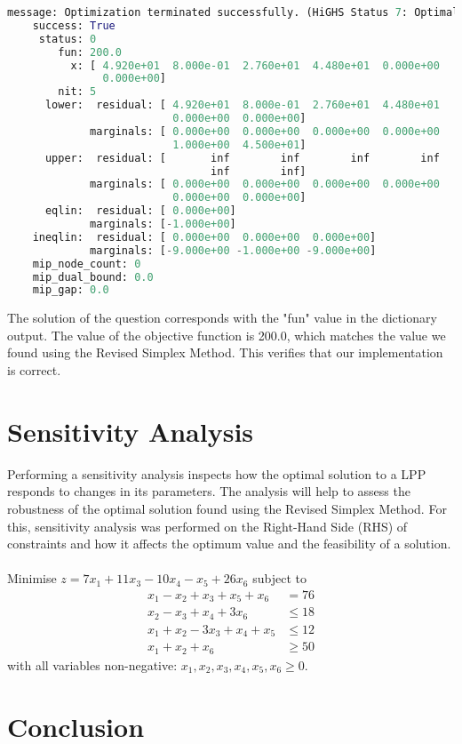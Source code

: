 \documentclass{article}
\numberwithin{equation}{section}
\begin{document}
\begin{lstlisting}[language=Python, basicstyle=\scriptsize]
    message: Optimization terminated successfully. (HiGHS Status 7: Optimal)
    success: True
     status: 0
        fun: 200.0
          x: [ 4.920e+01  8.000e-01  2.760e+01  4.480e+01  0.000e+00
               0.000e+00]
        nit: 5
      lower:  residual: [ 4.920e+01  8.000e-01  2.760e+01  4.480e+01
                          0.000e+00  0.000e+00]
             marginals: [ 0.000e+00  0.000e+00  0.000e+00  0.000e+00
                          1.000e+00  4.500e+01]
      upper:  residual: [       inf        inf        inf        inf
                                inf        inf]
             marginals: [ 0.000e+00  0.000e+00  0.000e+00  0.000e+00
                          0.000e+00  0.000e+00]
      eqlin:  residual: [ 0.000e+00]
             marginals: [-1.000e+00]
    ineqlin:  residual: [ 0.000e+00  0.000e+00  0.000e+00]
             marginals: [-9.000e+00 -1.000e+00 -9.000e+00]
    mip_node_count: 0
    mip_dual_bound: 0.0
    mip_gap: 0.0
\end{lstlisting}
The solution of the question corresponds with the "fun" value in the dictionary output. The value of the objective function is 200.0, which matches the value we found using the Revised Simplex Method. This verifies that our implementation is correct.

\newpage
\section{Sensitivity Analysis}
Performing a sensitivity analysis inspects how the optimal solution to a LPP responds to changes in its parameters. The analysis will help to assess the robustness of the optimal solution found using the Revised Simplex Method. For this, sensitivity analysis was performed on the Right-Hand Side (RHS) of constraints and how it affects the optimum value and the feasibility of a solution.  
\\ \\
Minimise $z = 7x_1 + 11x_3 - 10x_4 - x_5 + 26x_6$ subject to
\begin{align}
    x_1 - x_2 + x_3 + x_5 + x_6 &= 76 \\
    x_2 - x_3 + x_4 + 3x_6 &\leq 18 \\
    x_1 + x_2 - 3x_3 + x_4 + x_5 &\leq 12 \\
    x_1 + x_2 + x_6 &\geq 50
\end{align}
with all variables non-negative: $x_1, x_2, x_3, x_4, x_5, x_6 \geq 0$.

\newpage
\section{Conclusion}
\end{document}
